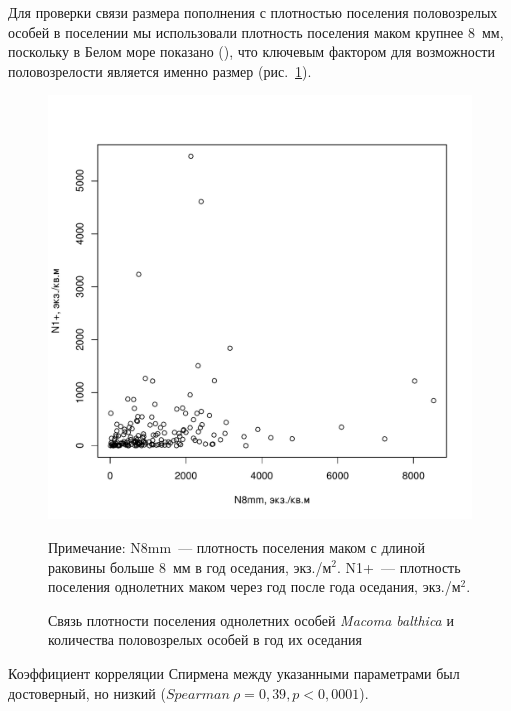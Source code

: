 Для проверки связи размера пополнения с плотностью поселения половозрелых особей в поселении мы использовали плотность поселения маком крупнее $8$~мм, поскольку в Белом море показано (\cite{Semenova_1980, Maximovich_1985}), что ключевым фактором для возможности половозрелости является именно размер (рис.~\ref{ris:N1year_vs_N8mm}).
    \begin{figure}[p]
        \includegraphics[width=\textwidth]{../White_Sea/oneyear_all_Kandalaksha_all/N8mm_vs_N1y_1.pdf}
    \caption{Связь плотности поселения однолетних особей {\it Macoma balthica} и количества половозрелых особей в год их оседания}
    \label{ris:N1year_vs_N8mm}

\footnotesize{Примечание: N8mm~--- плотность поселения маком с длиной раковины больше $8$~мм в год оседания, экз./м$^2$. N1+~--- плотность поселения однолетних маком через год после года оседания, экз./м$^2$.}
    \end{figure}
Коэффициент корреляции Спирмена между указанными параметрами был достоверный, но низкий ($Spearman\ \rho = 0,39, p < 0,0001$). 

